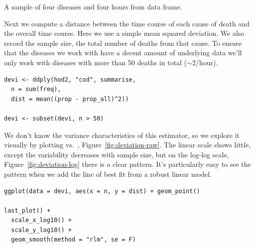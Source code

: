 \documentclass[article]{jss}
\begin{document}
\begin{table}[htbp]
  \centering
  \subfloat[]{
    \label{tbl:counts:1}
  }%
  \subfloat[]{
    \label{tbl:counts:2}
  }%
  \subfloat[]{
    \label{tbl:counts:3}
  }%
  \subfloat[]{
    \label{tbl:counts:4}
  }
  
  \caption{A sample of four diseases and four hours from  data frame.}
  \label{tbl:counts}
\end{table}

Next we compute a distance between the time course of each cause of death and the overall time course. Here we use a simple mean squared deviation.  We also record the sample size, the total number of deaths from that cause. To ensure that the diseases we work with have a decent amount of underlying data we'll only work with diseases with more than 50 deaths in total ($\sim$2/hour).

\begin{Verbatim}
devi <- ddply(hod2, "cod", summarise, 
  n = sum(freq), 
  dist = mean((prop - prop_all)^2))

devi <- subset(devi, n > 50)
\end{Verbatim}

We don't know the variance characteristics of this estimator, so we explore it visually by plotting  vs.\ , Figure~\ref{fig:deviation-raw}. The linear scale shows little, except the variability decreases with sample size, but on the log-log scale, Figure~\ref{fig:deviation-log} there is a clear pattern. It's particularly easy to see the pattern when we add the line of best fit from a robust linear model. 

\begin{Verbatim}
ggplot(data = devi, aes(x = n, y = dist) + geom_point()

last_plot() + 
  scale_x_log10() + 
  scale_y_log10() +
  geom_smooth(method = "rlm", se = F)
\end{Verbatim}
\end{document}
